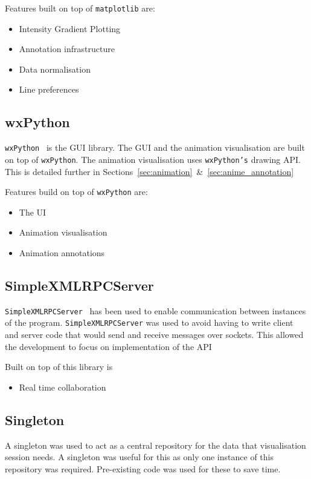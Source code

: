 Features built on top of \texttt{matplotlib} are:
\begin{itemize}
\item Intensity Gradient Plotting
\item Annotation infrastructure
\item Data normalisation
\item Line preferences
\end{itemize}

\subsection{wxPython}

\texttt{wxPython}~\cite{wxpython} is the \ac{GUI} library.  The \ac{GUI} and the animation visualisation are built on top of \texttt{wxPython}.  The animation visualisation uses \texttt{wxPython's} drawing \ac{API}.  This is detailed further in Sections~\ref{sec:animation}~\&~\ref{sec:anime_annotation}

Features build on top of \texttt{wxPython} are:
\begin{itemize}
\item The \ac{UI}
\item Animation visualisation
\item Animation annotations
\end{itemize}

\subsection{SimpleXMLRPCServer}

\texttt{SimpleXMLRPCServer}~\cite{xmlrpcserver} has been used to enable communication between instances of the program.  \texttt{SimpleXMLRPCServer} was used to avoid having to write client and server code that would send and receive messages over sockets.  This allowed the development to focus on implementation of the \ac{API}

Built on top of this library is
\begin{itemize}
\item Real time collaboration
\end{itemize}

\subsection{Singleton}

A singleton was used to act as a central repository for the data that visualisation session needs.  A singleton was useful for this as only one instance of this repository was required.  Pre-existing code was used for these to save time.

